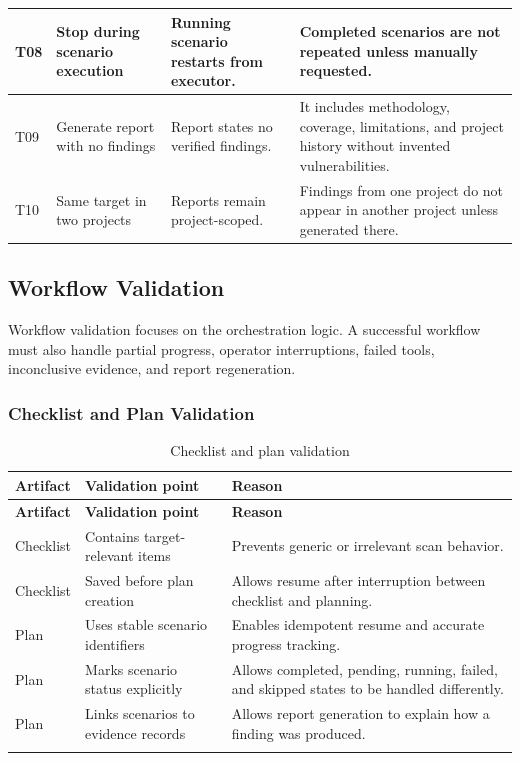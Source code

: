 \documentclass[12pt,a4paper]{report}
\begin{document}
\begin{longtable}{|p{}|p{}|p{}|p{}|}
\hline
T08 & Stop during scenario execution & Running scenario restarts from executor. & Completed scenarios are not repeated unless manually requested. \\
\hline
T09 & Generate report with no findings & Report states no verified findings. & It includes methodology, coverage, limitations, and project history without invented vulnerabilities. \\
\hline
T10 & Same target in two projects & Reports remain project-scoped. & Findings from one project do not appear in another project unless generated there. \\
\hline
\end{longtable}
\subsection{Workflow Validation}

Workflow validation focuses on the orchestration logic. A successful workflow must
also handle partial progress, operator interruptions, failed tools, inconclusive
evidence, and report regeneration.

\subsubsection{Checklist and Plan Validation}

\begin{longtable}{|p{}|p{}|p{}|}
\hline
\textbf{Artifact} & \textbf{Validation point} & \textbf{Reason} \\
\hline
\endfirsthead
\hline
\textbf{Artifact} & \textbf{Validation point} & \textbf{Reason} \\
\hline
\endhead
Checklist & Contains target-relevant items & Prevents generic or irrelevant scan
behavior. \\
\hline
Checklist & Saved before plan creation & Allows resume after interruption between
checklist and planning. \\
\hline
Plan & Uses stable scenario identifiers & Enables idempotent resume and accurate
progress tracking. \\
\hline
Plan & Marks scenario status explicitly & Allows completed, pending, running,
failed, and skipped states to be handled differently. \\
\hline
Plan & Links scenarios to evidence records & Allows report generation to explain
how a finding was produced. \\
\hline
\caption{Checklist and plan validation}
\label{tab:checklist_plan_validation}
\end{longtable}
\end{document}
